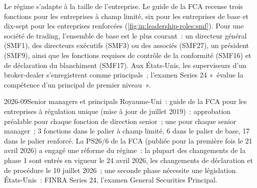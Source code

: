 Le régime s'adapte à la taille de l'entreprise. Le guide de la FCA recense trois fonctions pour les entreprises à champ limité,
six pour les entreprises de base et dix-sept pour les entreprises renforcées (\cref{fig:in:leadership-roles:smf}). Pour une société de trading,
l'ensemble de base est le plus courant~: un directeur général (SMF1), des directeurs exécutifs (SMF3) ou des associés (SMF27),
un président (SMF9), ainsi que les fonctions requises de contrôle de la conformité (SMF16) et de déclaration du blanchiment (SMF17). Aux États-Unis, les superviseurs d'un broker-dealer s'enregistrent comme
principals~; l'examen Series 24 «~évalue la compétence d'un principal de premier niveau~».

\begin{dated}{2026-09}{Senior managers et principals}\label{dat:in:leadership-roles:smcr}
Royaume-Uni~: guide de la FCA pour les entreprises à régulation unique (mise à jour de juillet 2019)~: approbation préalable pour chaque
fonction de direction senior~; une  pour chaque senior manager~; 3 fonctions dans le palier à champ limité, 6
dans le palier de base, 17 dans le palier renforcé. La PS26/6 de la FCA (publiée pour la première fois le 21 avril 2026) a engagé une réforme du régime~:
la plupart des changements de la phase 1 sont entrés en vigueur le 24 avril 2026, les changements de déclaration et de procédure le 10 juillet 2026~; une seconde phase
nécessite une législation. États-Unis~: FINRA Series 24, l'examen General Securities Principal.
\end{dated}

\begin{omfigure}

\label{fig:in:leadership-roles:smf}
\end{omfigure}

